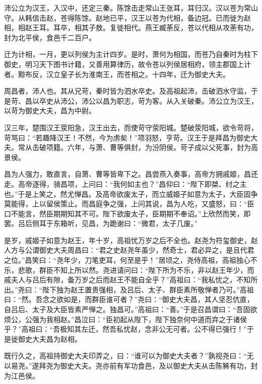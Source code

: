 \documentclass[12pt,UTF8]{ctexbook}
\begin{document}
沛公立为汉王，入汉中，还定三秦。陈馀击走常山王张耳，耳归汉。汉以苍为常山守。从韩信击赵，苍得陈馀。赵地已平，汉王以苍为代相，备边冠。已而徙为赵相，相赵王耳。耳卒，相其子敖。复徙相代。燕王臧荼反，苍以代相从攻荼有功，封为北平侯，食邑千二百户。



迁为计相，一月，更以列侯为主计四岁。是时，萧何为相国，而苍乃自秦时为柱下御史，明习天下图书计籍，又善用算律历，故令苍以列侯居相府，领主郡国上计者。黥布反，汉立皇子长为淮南王，而苍相之。十四年，迁为御史大夫。



周昌者，沛人也。其从兄苛，秦时皆为泗水卒史。及高祖起沛，击破泗水守监，于是苛、昌以卒史从沛公，沛公以昌为职志，苛为客。从入关破秦。沛公立为汉王，以苛为御史大夫，昌为中尉。



汉三年，楚围汉王荥阳急，汉王出去，而使苛守荥阳城。楚破荥阳城，欲令苛将，苛骂曰：“若趣降汉王！不然，今为虏矣！”项羽怒，亨苛。汉王于是拜昌为御史大夫。常从击破项籍。六年，与萧、曹等俱封，为汾阴侯。苛子成以父死事，封为高景侯。



昌为人强力，敢直言，自萧、曹等皆卑下之。昌尝燕入奏事，高帝方拥戚姬，昌还走。高帝逐得，骑昌项，上问曰：“我何如主也？”昌仰曰：“陛下即桀、纣之主也。”于是上笑之，然尤惮昌。及高帝欲废太子，而立威姬子如意为太子，大臣固争莫能得，上以留侯策止。而昌庭争之强，上问其说，昌为人吃，又盛怒，曰：“臣口不能言，然臣期期知其不可。陛下欲废太子，臣期期不奉诏。”上欣然而笑，即罢。吕后侧耳于东箱听，见昌，为跪谢曰：“微君，太子几废。”



是岁，戚姬子如意为赵王，年十岁，高祖忧万岁之后不全也。赵尧为符玺御史，赵人方与公谓御史大夫周昌曰：“君之史赵尧年虽少，然奇士，君必异之，是且代君之位。”昌笑曰：“尧年少，刀笔吏耳，何至是乎！”居顷之，尧侍高祖，高祖独心不乐，悲歌，群臣不知上所以然。尧进请问曰：“陛下所为不乐，非以赵王年少，而戚夫人与吕后有隙，备万岁之后而赵王不能自全乎？”高祖曰：“我私忧之，不知所出。”尧曰：“陛下独为赵王置贵强相，及吕后、太子、群臣素所敬惮者乃可。”高祖曰：“然。吾念之欲如是，而群臣谁可者？”尧曰：“御史大夫昌，其人坚忍伉直，自吕后、太子及大臣皆素严惮之。独昌可。”高祖曰：“善。”于是召昌谓曰：“吾固欲烦公，公强为我相赵。”昌泣曰：“臣初起从陛下，陛下独奈何中道而弃之于诸侯乎？”高祖曰：“吾极知其左迁，然吾私忧赵，念非公无可者。公不得已强行！”于是徙御史大夫昌为赵相。



既行久之，高祖持御史大夫印弄之，曰：“谁可以为御史大夫者？”孰视尧曰：“无以易尧。”遂拜尧为御史大夫。尧亦前有军功食邑，及以御史大夫从击陈豨有功，封为江邑侯。
\end{document}
